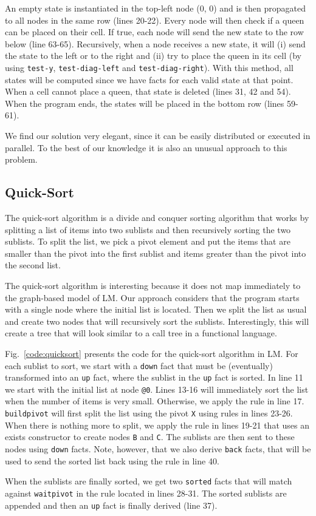 An empty state is instantiated in the top-left node (0, 0) and is then propagated to all nodes in the same row (lines 20-22).
Every node will then check if a queen can be placed on their cell. If true, each node will send the new
state to the row below (line 63-65).
Recursively, when a node receives a new state, it will (i) send the state to the left
or to the right and (ii) try to place the queen in its cell (by using \texttt{test-y}, \texttt{test-diag-left} and \texttt{test-diag-right}). With this method,
all states will be computed since we have facts for each valid state
at that point. When a cell cannot place a queen, that state is deleted (lines 31, 42 and 54).
When the program ends, the states will be placed in the bottom row (lines 59-61).

We find our solution very elegant, since it can be easily distributed or executed in parallel. To the best of our knowledge it is also an unusual approach to this problem.

\subsection{Quick-Sort}

The quick-sort algorithm is a divide and conquer sorting algorithm that works by splitting
a list of items into two sublists and then recursively sorting the two sublists.
To split the list, we pick a pivot element and put the items that are smaller than the pivot
into the first sublist and items greater than the pivot into the second list.

The quick-sort algorithm is interesting because it does not map immediately to the graph-based
model of LM. Our approach considers that the program starts with a single node where
the initial list is located. Then we split the list as usual and create two nodes
that will recursively sort the sublists. Interestingly, this will create a tree
that will look similar to a call tree in a functional language.

Fig.~\ref{code:quicksort} presents the code for the quick-sort algorithm in LM.
For each sublist to sort, we start with a \texttt{down} fact that must be (eventually)
transformed into an \texttt{up} fact, where the sublist in the \texttt{up} fact is sorted.
In line 11 we start with the initial list at node \texttt{@0}. Lines 13-16 will immediately
sort the list when the number of items is very small. Otherwise, we apply the rule in line 17.
\texttt{buildpivot} will first split the list using the pivot \texttt{X} using rules in
lines 23-26. When there is nothing more to split, we apply the rule in lines 19-21
that uses an exists constructor to create nodes \texttt{B} and \texttt{C}. The sublists
are then sent to these nodes using \texttt{down} facts. Note, however, that we also
derive \texttt{back} facts, that will be used to send the sorted list back using the rule
in line 40.

When the sublists are finally sorted, we get two \texttt{sorted} facts that will match
against \texttt{waitpivot} in the rule located in lines 28-31. The sorted sublists
are appended and then an \texttt{up} fact is finally derived (line 37).

